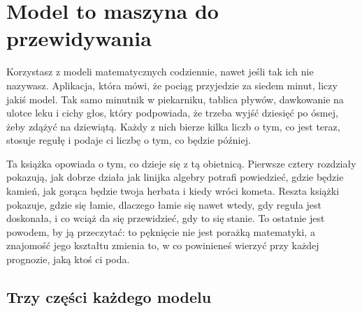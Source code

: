 
\chapter{Model to maszyna do przewidywania}
\label{ch:models}

\noindent
Korzystasz z modeli matematycznych codziennie, nawet jeśli tak ich nie
nazywasz. Aplikacja, która mówi, że pociąg przyjedzie za siedem minut, liczy
jakiś model. Tak samo minutnik w piekarniku, tablica pływów, dawkowanie na
ulotce leku i cichy głos, który podpowiada, że trzeba wyjść dziesięć po
ósmej, żeby zdążyć na dziewiątą. Każdy z nich bierze kilka liczb o tym, co
jest teraz, stosuje regułę i podaje ci liczbę o tym, co będzie później.

Ta książka opowiada o tym, co dzieje się z tą obietnicą. Pierwsze cztery
rozdziały pokazują, jak dobrze działa \dash{} jak linijka algebry potrafi
powiedzieć, gdzie będzie kamień, jak gorąca będzie twoja herbata i kiedy
wróci kometa. Reszta książki pokazuje, gdzie się łamie, dlaczego łamie się
nawet wtedy, gdy reguła jest doskonała, i co wciąż da się przewidzieć, gdy
to się stanie. To ostatnie jest powodem, by ją przeczytać: to pęknięcie nie
jest porażką matematyki, a znajomość jego kształtu zmienia to, w co
powinieneś wierzyć przy każdej prognozie, jaką ktoś ci poda.

\begin{outcomes}
\end{outcomes}

\section{Trzy części każdego modelu}
\label{sec:ch01-parts}

